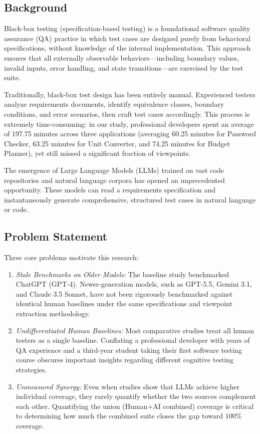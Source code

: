 \documentclass[conference]{IEEEtran}
\begin{document}
\subsection{Background}
Black-box testing (specification-based testing) is a foundational software quality assurance (QA) practice in which test cases are designed purely from behavioral specifications, without knowledge of the internal implementation. This approach ensures that all externally observable behaviors—including boundary values, invalid inputs, error handling, and state transitions—are exercised by the test suite.

Traditionally, black-box test design has been entirely manual. Experienced testers analyze requirements documents, identify equivalence classes, boundary conditions, and error scenarios, then craft test cases accordingly. This process is extremely time-consuming: in our study, professional developers spent an average of 197.75 minutes across three applications (averaging 60.25 minutes for Password Checker, 63.25 minutes for Unit Converter, and 74.25 minutes for Budget Planner), yet still missed a significant fraction of viewpoints.

The emergence of Large Language Models (LLMs) trained on vast code repositories and natural language corpora has opened an unprecedented opportunity. These models can read a requirements specification and instantaneously generate comprehensive, structured test cases in natural language or code. 

\subsection{Problem Statement}
Three core problems motivate this research:
\begin{enumerate}
    \item \textit{Stale Benchmarks on Older Models:} The baseline study benchmarked ChatGPT (GPT-4). Newer-generation models, such as GPT-5.5, Gemini 3.1, and Claude 3.5 Sonnet, have not been rigorously benchmarked against identical human baselines under the same specifications and viewpoint extraction methodology.
    \item \textit{Undifferentiated Human Baselines:} Most comparative studies treat all human testers as a single baseline. Conflating a professional developer with years of QA experience and a third-year student taking their first software testing course obscures important insights regarding different cognitive testing strategies.
    \item \textit{Unmeasured Synergy:} Even when studies show that LLMs achieve higher individual coverage, they rarely quantify whether the two sources complement each other. Quantifying the union (Human+AI combined) coverage is critical to determining how much the combined suite closes the gap toward 100\% coverage.
\end{enumerate}
\end{document}
